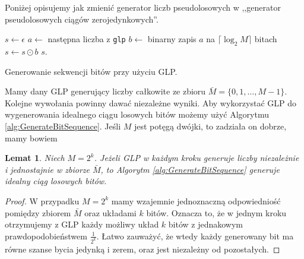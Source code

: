 \documentclass[a4paper,11pt,twoside]{book}
\newcommand{\ceil}[1]{\lceil#1\rceil}
\newtheorem{lemat}[twier]{Lemat}
\theoremstyle{definition}
\begin{document}
Poniżej opisujemy jak zmienić generator liczb pseudolosowych w ,,generator pseudolosowych ciągów zerojedynkowych''.

\begin{algorithm}
 \begin{algorithmic}[1]
    \State $s \gets \epsilon$
      \State $a \gets$ następna liczba z \texttt{glp}
      \State $b \gets$ binarny zapis $a$ na $\ceil{\log_2 M}$ bitach
      \State $s \gets s \odot b$
     \EndWhile
    \State \Return $s$.
  \EndFunction
 \end{algorithmic}
 \caption{Generowanie sekwencji bitów przy użyciu GLP.}
 \label{alg:GenerateBitSequence}
\end{algorithm}


Mamy dany GLP generujący liczby całkowite ze zbioru $\bar{M} = \{0, 1, \ldots, M-1 \}$. Kolejne wywołania powinny dawać niezależne wyniki. Aby wykorzystać GLP do wygenerowania idealnego ciągu losowych bitów możemy użyć Algorytmu \ref{alg:GenerateBitSequence}. Jeśli $M$ jest potęgą dwójki, to zadziała on dobrze, mamy bowiem
\begin{lemat}
 Niech $M = 2^k$. Jeżeli GLP w każdym kroku generuje liczby niezależnie i jednostajnie w zbiorze $\bar{M}$, to Algorytm \ref{alg:GenerateBitSequence} generuje idealny ciąg losowych bitów.
\end{lemat}
\begin{proof}
 W przypadku $M = 2^k$ mamy wzajemnie jednoznaczną odpowiedniość pomiędzy zbiorem $\bar{M}$ oraz układami $k$ bitów. Oznacza to, że w jednym kroku otrzymujemy z GLP każdy możliwy układ $k$ bitów z jednakowym prawdopodobieństwem $\frac{1}{2^k}$. Łatwo zauważyć, że wtedy każdy generowany bit ma równe szanse bycia jedynką i zerem, oraz jest niezależny od pozostałych.
\end{proof}
\end{document}
